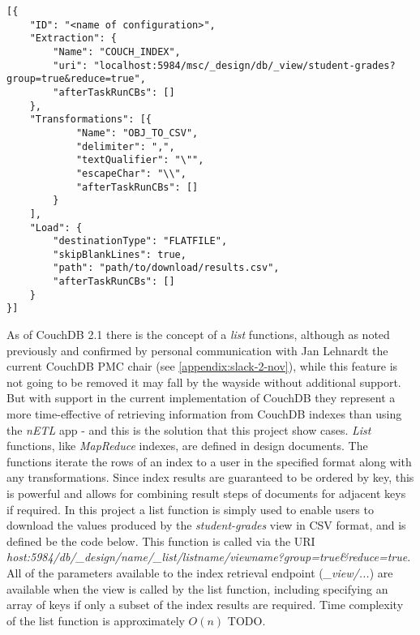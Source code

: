 \begin{verbatim}
[{
    "ID": "<name of configuration>",
    "Extraction": {
        "Name": "COUCH_INDEX",
        "uri": "localhost:5984/msc/_design/db/_view/student-grades?group=true&reduce=true",
        "afterTaskRunCBs": []
    },
    "Transformations": [{
            "Name": "OBJ_TO_CSV",
            "delimiter": ",",
            "textQualifier": "\"",
            "escapeChar": "\\",
            "afterTaskRunCBs": []
        }
    ],
    "Load": {
        "destinationType": "FLATFILE",
        "skipBlankLines": true,
        "path": "path/to/download/results.csv",
        "afterTaskRunCBs": []
    }
}]
\end{verbatim}

As of CouchDB 2.1 there is the concept of a \textit{list} functions, although as noted previously and confirmed by personal communication with Jan Lehnardt the current CouchDB PMC chair (see \ref{appendix:slack-2-nov}), while this feature is not going to be removed it may fall by the wayside without additional support. But with support in the current implementation of CouchDB they represent a more time-effective of retrieving information from CouchDB indexes than using the \textit{nETL} app - and this is the solution that this project show cases. \textit{List} functions, like \textit{MapReduce} indexes, are defined in design documents. The functions iterate the rows of an index to a user in the specified format along with any transformations. Since index results are guaranteed to be ordered by key, this is powerful and allows for combining result steps of documents for adjacent keys if required. In this project a list function is simply used to enable users to download the values produced by the \textit{student-grades} view in CSV format, and is defined be the code below. This function is called via the URI \textit{host:5984/db/\_design/name/\_list/listname/viewname?group=true\&reduce=true}. All of the parameters available to the index retrieval endpoint (\textit{\_view/...}) are available when the view is called by the list function, including specifying an array of keys if only a subset of the index results are required. Time complexity of the list function is approximately $ O(n) $ TODO.

